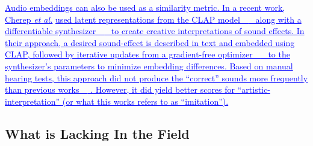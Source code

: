 \documentclass[lettersize,journal]{IEEEtran}
\renewcommand{\DIFadd}[1]{\textcolor{blue}{\uline{#1}}}
\providecommand{\DIFadd}[1]{{\protect\color{blue}\uwave{#1}}} %
\providecommand{\DIFaddbegin}{} %
\providecommand{\DIFaddend}{} %
\providecommand{\DIFaddincludegraphics}[2][]{{\color{blue}\fbox{\DIFOincludegraphics[#1]{#2}}}} %
\DeclareRobustCommand{\DIFaddbegin}{\DIFOaddbegin \let\includegraphics\DIFaddincludegraphics} %
\DeclareRobustCommand{\DIFaddend}{\DIFOaddend \let\includegraphics\DIFOincludegraphics} %
\begin{document}
\DIFaddbegin \DIFadd{Audio embeddings can also be used as a similarity metric. In a recent work, Cherep }\textit{\DIFadd{et al.}} \DIFadd{used latent representations from the CLAP model~\mbox{%
\cite{wu2023large} }\hskip0pt%
along with a differentiable synthesizer~\mbox{%
\cite{synthhaxcherep2023} }\hskip0pt%
to create creative interpretations of sound effects. In their approach, a desired sound-effect is described in text and embedded using CLAP, followed by iterative updates from a gradient-free optimizer~\mbox{%
\cite{evosax2022github} }\hskip0pt%
to the synthesizer's parameters to minimize embedding differences. Based on manual hearing tests, this approach did not produce the ``correct'' sounds more frequently than previous works~\mbox{%
\cite{kreuk2022audiogen}}\hskip0pt%
. However, it did yield better scores for ``artistic-interpretation'' (or what this works refers to as ``imitation'').
}\DIFaddend 

\DIFaddbegin 

\DIFaddend \subsection{What is Lacking In the Field}
\label{sec:lacking}
\end{document}
